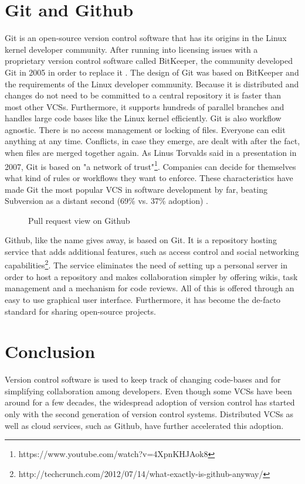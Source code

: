 \section{Git and Github}
Git is an open-source version control software that has its origins in the Linux kernel developer community. After running into licensing issues with a proprietary version control software called BitKeeper, the community developed Git in 2005 in order to replace it \cite{chacon_pro_2009, ruparelia_history_2010}. The design of Git was based on BitKeeper and the requirements of the Linux developer community. Because it is distributed and changes do not need to be committed to a central repository it is faster than most other VCSs. Furthermore, it supports hundreds of parallel branches and handles large code bases like the Linux kernel efficiently. Git is also workflow agnostic. There is no access management or locking of files. Everyone can edit anything at any time. Conflicts, in case they emerge, are dealt with after the fact, when files are merged together again. As Linus Torvalds said in a presentation in 2007, Git is based on "a network of trust"\footnote{https://www.youtube.com/watch?v=4XpnKHJAok8}. Companies can decide for themselves what kind of rules or workflows they want to enforce. These characteristics have made Git the most popular VCS in software development by far, beating Subversion as a distant second (69\% vs. 37\% adoption) \cite{_stack_2015}.

\begin{figure}[h!]
 \centering
 \caption{Pull request view on Github}
 \label{fig:github-pr}
\end{figure}

Github, like the name gives away, is based on Git. It is a repository hosting service that adds additional features, such as access control and social networking capabilities\footnote{http://techcrunch.com/2012/07/14/what-exactly-is-github-anyway/}. The service eliminates the need of setting up a personal server in order to host a  repository and makes collaboration simpler by offering wikis, task management and a mechanism for code reviews. All of this is offered through an easy to use graphical user interface. Furthermore, it has become the de-facto standard for sharing open-source projects.

\section{Conclusion}
Version control software is used to keep track of changing code-bases and for simplifying collaboration among developers. Even though some VCSs have been around for a few decades, the widespread adoption of version control has started only with the second generation of version control systems. Distributed VCSs as well as cloud services, such as Github, have further accelerated this adoption.

